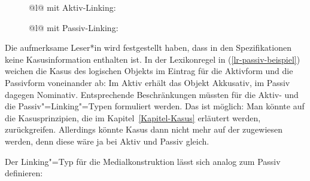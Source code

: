 \begin{figure}
\eal
\ex 
\begin{tabular}[t]{@{}l@{}}
 mit Aktiv-Linking:\\
\end{tabular}
\ex
\begin{tabular}[t]{@{}l@{}}
 mit Passiv-Linking:\\
\end{tabular}
\zl
\vspace{-\baselineskip}
\end{figure}
Die aufmerksame Leser*in wird festgestellt haben, dass in den Spezifikationen keine
Kasusinformation enthalten ist. In der Lexikonregel in (\ref{lr-passiv-beispiel})
weichen die Kasus des logischen Objekts im Eintrag für die Aktivform und die Passivform
voneinander ab: Im Aktiv erhält das Objekt Akkusativ, im Passiv dagegen Nominativ.
Entsprechende Beschränkungen müssten für die Aktiv- und die Passiv"=Linking"=Typen
formuliert werden. Das ist möglich: Man könnte auf die Kasusprinzipien,
die im Kapitel~\ref{Kapitel-Kasus} erläutert werden, zurückgreifen. Allerdings könnte Kasus dann
nicht mehr auf der \argstl zugewiesen werden, denn diese wäre ja bei Aktiv und Passiv gleich.
\pagebreak

Der Linking"=Typ für die Medialkonstruktion lässt sich analog zum Passiv definieren:

